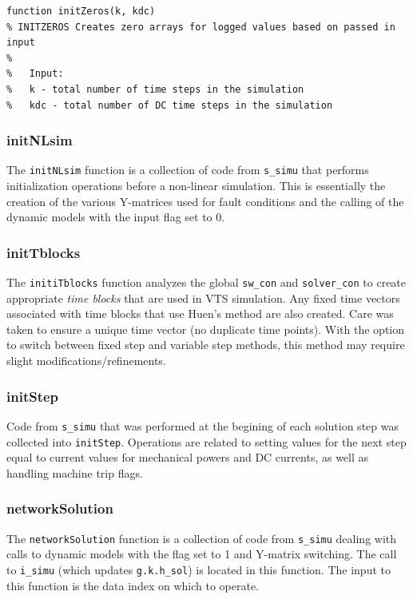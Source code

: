 \begin{verbatim}
function initZeros(k, kdc)
% INITZEROS Creates zero arrays for logged values based on passed in input
%
%   Input:
%   k - total number of time steps in the simulation
%   kdc - total number of DC time steps in the simulation
\end{verbatim}

\subsubsection{initNLsim}  
The \verb|initNLsim| function is a collection of code from \verb|s_simu| that performs initialization operations before a non-linear simulation.
This is essentially the creation of the various Y-matrices used for fault conditions and the calling of the dynamic models with the input flag set to 0.

\pagebreak
\subsubsection{initTblocks}  
The \verb|initiTblocks| function analyzes the global \verb|sw_con| and \verb|solver_con| to create appropriate \emph{time blocks} that are used in VTS simulation.
Any fixed time vectors associated with time blocks that use Huen's method are also created.
Care was taken to ensure a unique time vector (no duplicate time points).
With the option to switch between fixed step and variable step  methods, this method may require slight modifications/refinements.

\subsubsection{initStep}  
Code from \verb|s_simu| that was performed at the begining of each solution step was collected into \verb|initStep|.
Operations are related to setting values for the next step equal to current values for mechanical powers and DC currents, as well as handling machine trip flags.


\subsubsection{networkSolution}  
The \verb|networkSolution| function is a collection of code from \verb|s_simu| dealing with calls to dynamic models with the flag set to 1 and Y-matrix switching.
The call to \verb|i_simu| (which updates \verb|g.k.h_sol|) is located in this function.
The input to this function is the data index on which to operate.

